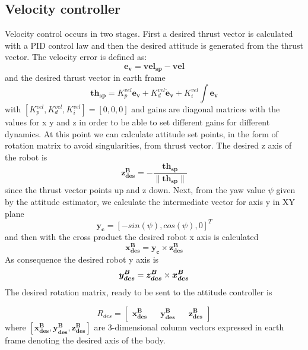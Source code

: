 \subsection{Velocity controller}
Velocity control occurs in two stages. First a desired thrust vector is calculated with a PID control law and then the desired attitude is generated from the thrust vector. The velocity error is defined as:
\begin{equation}
 \boldsymbol{e_v} =  \boldsymbol{vel_{sp}} - \boldsymbol{vel}
\end{equation}
and the desired thrust vector in earth frame
\begin{equation}
 \boldsymbol{th_{sp}} = K_p^{vel}  \boldsymbol{e_v} + K_d^{vel}  \boldsymbol{\dot{e}_v} + K_i^{vel} \int  \boldsymbol{e_v}
\end{equation}
with $ [K_p^{vel} ,  K_d^{vel} ,  K_i^{vel}] = [0,0,0]$  and gains are diagonal matrices with the values for x y and z in order to be able to set different gains for different dynamics. At this point we can calculate attitude set points, in the form of rotation matrix to avoid singularities, from thrust vector. The desired z axis of the robot is
\begin{equation}
	\boldsymbol{z^B_{des}} = - \frac{\boldsymbol{th_{sp}}}{\lVert\boldsymbol{th_{sp}}\rVert} 
\end{equation}
since the thrust vector points up and z down. Next, from the yaw value $\psi$ given by the attitude estimator, we calculate the intermediate vector for axis y in XY plane
\begin{equation}
	\boldsymbol{y_c} = [-sin(\psi) , cos(\psi),0]^T
\end{equation}
and then with the cross product the desired robot x axis is calculated
\begin{equation}
	\boldsymbol{x^B_{des}} = \boldsymbol{y_c} \times \boldsymbol{z^B_{des}}
\end{equation}
As consequence the desired robot y axis is
\begin{equation}
\vspace{2ex}
\boldsymbol{y^B_{des}} = \boldsymbol{z^B_{des}} \times \boldsymbol{x^B_{des}}
\end{equation}
\noindent
The desired rotation matrix, ready to be sent to the attitude controller is

\begin{equation}
R_{des} = \begin{bmatrix}
\boldsymbol{x^B_{des}} && \boldsymbol{y^B_{des}} && \boldsymbol{z^B_{des}}
\end{bmatrix}
\end{equation}
where $[\boldsymbol{x^B_{des}} , \boldsymbol{y^B_{des}} , \boldsymbol{z^B_{des}}]$ are 3-dimensional column vectors expressed in earth frame denoting the desired axis of the body.

